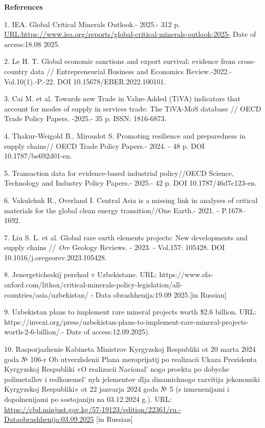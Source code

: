 \begin{center}
{\bfseries References}
\end{center}

\begin{refs}
1. IEA. Global Critical Minerals Outlook.- 2025.- 312 p.
\url{URL:https://www.iea.org/reports/global-critical-minerals-outlook-2025-}
Date of access:18.08 2025.

2. Le H. T. Global economic sanctions and export survival: evidence from
cross-country data // Entrepreneurial Business and Economics
Review.-2022.-Vol.10(1).-P.-22. DOI 10.15678/EBER.2022.100101.

3. Cai M. et al. Towards new Trade in Value-Added (TiVA) indicators that
account for modes of supply in services trade: The TiVA-MoS database //
OECD Trade Policy Papers. -2025.- 35 p. ISSN: 1816-6873.

4. Thakur-Weigold B., Miroudot S. Promoting resilience and preparedness
in supply chains// OECD Trade Policy Papers.- 2024. - 48 p. DOI
10.1787/be692d01-en.

5. Transaction data for evidence-based industrial policy//OECD Science,
Technology and Industry Policy Papers.- 2025.- 42 p. DOI
10.1787/46d7c123-en.

6. Vakulchuk R., Overland I. Central Asia is a missing link in analyses
of critical materials for the global clean energy transition//One
Earth.- 2021. - P.1678--1692.

7. Liu S. L. et al. Global rare earth elements projects: New
developments and supply chains // \emph{Ore} Geology Reviews. - 2023. -
Vol.157: 105428. DOI 10.1016/j.oregeorev.2023.105428.

8. Jenergeticheskij perehod v Uzbekistane. URL:
https://www.sfa-oxford.com/lithox/critical-minerals-policy-legislation/all-countries/asia/uzbekistan/
- Data obrashhenija:19.09 2025.{[}in Russian{]}

9. Uzbekistan plans to implement rare mineral projects worth \$2.6
billion. URL:
https://invexi.org/press/uzbekistan-plans-to-implement-rare-mineral-projects-worth-2-6-billion/.-
Date of access:12.09.2025).

10. Rasporjazhenie Kabineta Ministrov Kyrgyzskoj Respubliki ot 20 marta
2024 goda № 106-r Ob utverzhdenii Plana meroprijatij po realizacii Ukaza
Prezidenta Kyrgyzskoj Respubliki «O realizacii
Nacional' nogo proekta po dobyche polimetallov i
redkozemel' nyh jelementov dlja dinamichnogo razvitija
jekonomiki Kyrgyzskoj Respubliki» ot 22 janvarja 2024 goda № 5 (s
izmenenijami i dopolnenijami po sostojaniju na 03.12.2024 g.). URL:
\url{https://cbd.minjust.gov.kg/57-19123/edition/22361/ru.-Dataobrashhenija:03.09.2025}
{[}in Russian{]}


\end{refs}
